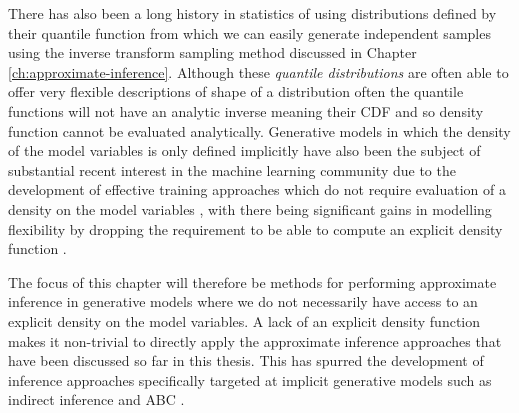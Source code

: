 There has also been a long history in statistics of using distributions defined by their quantile function \citep{hastings1947low,tukey1960practical} from which we can easily generate independent samples using the inverse transform sampling method discussed in Chapter \ref{ch:approximate-inference}. Although these \emph{quantile distributions} are often able to offer very flexible descriptions of shape of a distribution \citep{gilchrist2000statistical} 
often the quantile functions will not have an analytic inverse meaning their \ac{CDF} and so density function cannot be evaluated analytically. Generative models in which the density of the model variables is only defined implicitly have also been the subject of substantial recent interest in the machine learning community due to the development of effective training approaches which do not require evaluation of a density on the model variables \citep{li2015generative,dziugaite2015training,goodfellow2014generative}, with there being significant gains in modelling flexibility by dropping the requirement to be able to compute an explicit density function \citep{mohamed2016learning,tran2017deep}.


The focus of this chapter will therefore be methods for performing approximate inference in generative models where we do not necessarily have access to an explicit density on the model variables. 
A lack of an explicit density function makes it non-trivial to directly apply the approximate inference approaches that have been discussed so far in this thesis. This has spurred the development of inference approaches specifically targeted at implicit generative models such as indirect inference \citep{gourieroux1993indirect} and \acf{ABC} \citep{beaumont2002approximate}.%
 

